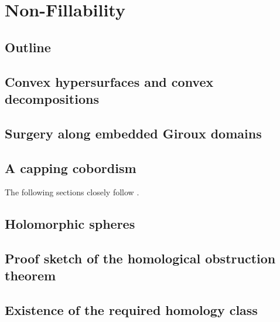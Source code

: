 \documentclass[oneside]{amsbook}
\begin{document}
\chapter{Non-Fillability}\label{chap:nonfillable}
\section{Outline}

\section{Convex hypersurfaces and convex decompositions}\label{sec:convex_decomposition}

\section{Surgery along embedded Giroux domains}

\section{A capping cobordism}
The following sections closely follow \cite[Section 6]{BGM22}.

\section{Holomorphic spheres}


\section{Proof sketch of the homological obstruction theorem}\label{sec:proof_hom_obstr}

\section{Existence of the required homology class}\label{sec:homology_class}

\newpage


\end{document}
